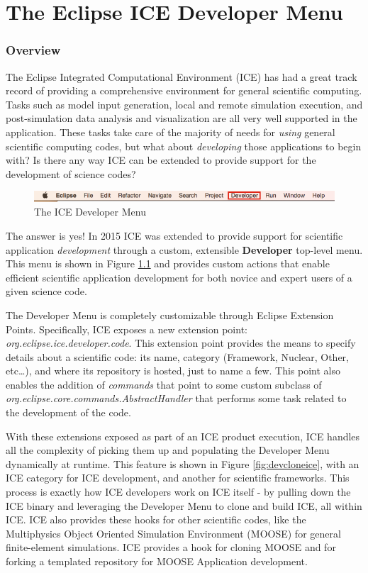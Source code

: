 \chapter{The Eclipse ICE Developer Menu}

\subsection*{Overview}
The Eclipse Integrated Computational Environment (ICE) has had a great track
record of providing a comprehensive environment for general scientific
computing. Tasks such as model input generation, local and remote simulation
execution, and post-simulation data analysis and visualization are all very well
supported in the application. These tasks take care of the majority of needs
for \emph{using} general scientific computing codes, but what about
\emph{developing} those applications to begin with? Is there any way ICE can be
extended to provide support for the development of science codes?

\begin{figure}[h]
\includegraphics[width=\textwidth]{figures/icemenu.png}
\centering
\caption{The ICE Developer Menu}
\label{fig:devmenu}
\end{figure}

The answer is yes! In 2015 ICE was extended to provide support for scientific
application \emph{development} through a custom, extensible \textbf{Developer} 
top-level menu. This menu is shown in Figure
\ref{fig:devmenu} and provides custom actions that enable efficient scientific
application development for both novice and expert users of a given science
code.

The Developer Menu is completely customizable through Eclipse Extension Points.
Specifically, ICE exposes a new extension point:
\emph{org.eclipse.ice.developer.code}. This extension point provides the means
to specify details about a scientific code: its name, category (Framework,
Nuclear, Other, etc\ldots), and where its repository is hosted, just to name a
few. This point also enables the addition of \emph{commands} that point to some
custom subclass of \emph{org.eclipse.core.commands.AbstractHandler} that
performs some task related to the development of the code.

With these extensions exposed as part of an ICE product execution, ICE
handles all the complexity of picking them up and populating the Developer Menu
dynamically at runtime. This feature is shown in Figure \ref{fig:devcloneice},
with an ICE category for ICE development, and another for scientific frameworks.
This process is exactly how ICE developers work on ICE itself - by pulling down
the ICE binary and leveraging the Developer Menu to clone and build ICE, all
within ICE. ICE also provides these hooks for other scientific codes, like the
Multiphysics Object Oriented Simulation Environment (MOOSE) for general
finite-element simulations. ICE provides a hook for cloning MOOSE and for
forking a templated repository for MOOSE Application development.

